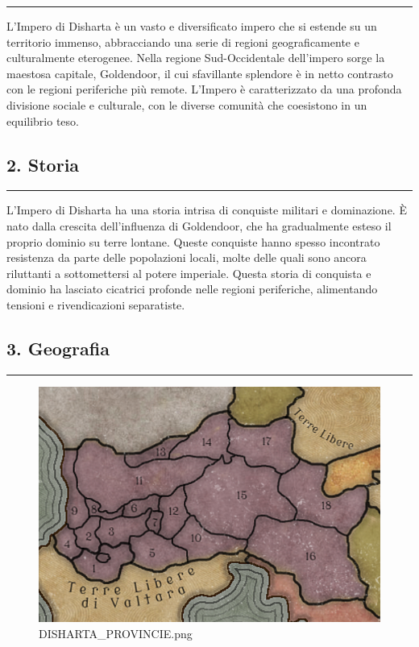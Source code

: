 \begin{center}\rule{0.5\linewidth}{0.5pt}\end{center}

L'Impero di Disharta è un vasto e diversificato impero che si estende su
un territorio immenso, abbracciando una serie di regioni geograficamente
e culturalmente eterogenee. Nella regione Sud-Occidentale dell'impero
sorge la maestosa capitale, Goldendoor, il cui sfavillante splendore è
in netto contrasto con le regioni periferiche più remote. L'Impero è
caratterizzato da una profonda divisione sociale e culturale, con le
diverse comunità che coesistono in un equilibrio teso.

\subsection{2. Storia}\label{storia}

\begin{center}\rule{0.5\linewidth}{0.5pt}\end{center}

L'Impero di Disharta ha una storia intrisa di conquiste militari e
dominazione. È nato dalla crescita dell'influenza di Goldendoor, che ha
gradualmente esteso il proprio dominio su terre lontane. Queste
conquiste hanno spesso incontrato resistenza da parte delle popolazioni
locali, molte delle quali sono ancora riluttanti a sottomettersi al
potere imperiale. Questa storia di conquista e dominio ha lasciato
cicatrici profonde nelle regioni periferiche, alimentando tensioni e
rivendicazioni separatiste.

\subsection{3. Geografia}\label{geografia}

\begin{center}\rule{0.5\linewidth}{0.5pt}\end{center}

\begin{figure}
\centering
\includegraphics{DISHARTA_PROVINCIE.png}
\caption{DISHARTA\_PROVINCIE.png}
\end{figure}

